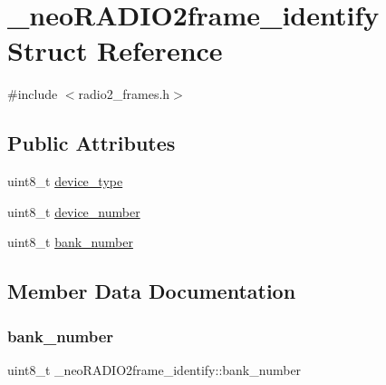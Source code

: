 \hypertarget{struct__neo_r_a_d_i_o2frame__identify}{}\section{\+\_\+neo\+R\+A\+D\+I\+O2frame\+\_\+identify Struct Reference}
\label{struct__neo_r_a_d_i_o2frame__identify}


{\ttfamily \#include $<$radio2\+\_\+frames.\+h$>$}

\subsection*{Public Attributes}
\begin{DoxyCompactItemize}
\item 
uint8\+\_\+t \mbox{\hyperlink{struct__neo_r_a_d_i_o2frame__identify_ae0c891394ecf630614023803d56fb915}{device\+\_\+type}}
\item 
uint8\+\_\+t \mbox{\hyperlink{struct__neo_r_a_d_i_o2frame__identify_a1b78f0f664637058afe3b79e12d268b3}{device\+\_\+number}}
\item 
uint8\+\_\+t \mbox{\hyperlink{struct__neo_r_a_d_i_o2frame__identify_ad13f68185a744e37a5adf7735e1e8a2f}{bank\+\_\+number}}
\end{DoxyCompactItemize}


\subsection{Member Data Documentation}
\mbox{\label{struct__neo_r_a_d_i_o2frame__identify_ad13f68185a744e37a5adf7735e1e8a2f}} 
\subsubsection{\texorpdfstring{bank\+\_\+number}{bank\_number}}
{\footnotesize\ttfamily uint8\+\_\+t \+\_\+neo\+R\+A\+D\+I\+O2frame\+\_\+identify\+::bank\+\_\+number}

\mbox{\label{struct__neo_r_a_d_i_o2frame__identify_a1b78f0f664637058afe3b79e12d268b3}} 
